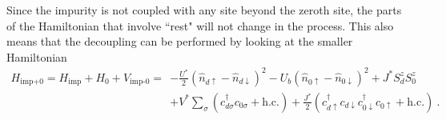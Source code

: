 Since the impurity is not coupled with any site beyond the zeroth site, the parts of the Hamiltonian that involve ``rest" will not change in the process. This also means that the decoupling can be performed by looking at the smaller Hamiltonian
\begin{eqnarray}
	H_\text{imp+0} = H_\text{imp} + H_\text{0} + V_\text{imp-0} =& -\frac{U^*}{2}\left( \hat n_{d \uparrow} - \hat n_{d \downarrow} \right)^2 - U_b \left( \hat n_{0 \uparrow} - \hat n_{0 \downarrow} \right)^2 + J^*S_d^z S_0^z\nonumber\\
								    & + {V^*}\sum_\sigma \left(c^\dagger_{d\sigma}c_{0\sigma} + \text{h.c.}\right) + \frac{J^*}{2}\left( c^\dagger_{d \uparrow}c_{d \downarrow} c^\dagger_{0 \downarrow} c_{0 \uparrow} + \text{h.c.} \right)~.
\end{eqnarray}

